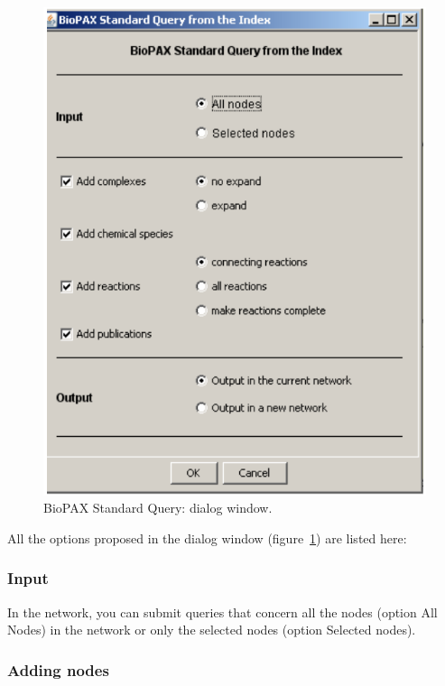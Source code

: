 \begin{figure}
\centering
\includegraphics[width=.5\textwidth]{graphics/Standard_Query_Dialog}
\caption{BioPAX Standard Query: dialog window.}
\label{Standard_Query_Dialog}
\end{figure}

All the options proposed in the dialog window (figure~\ref{Standard_Query_Dialog}) are listed here:

\subsubsection{Input}

In the network, you can submit queries that concern all the nodes (option All Nodes) in the network or only the selected nodes (option Selected nodes). 

\subsubsection{Adding nodes}


